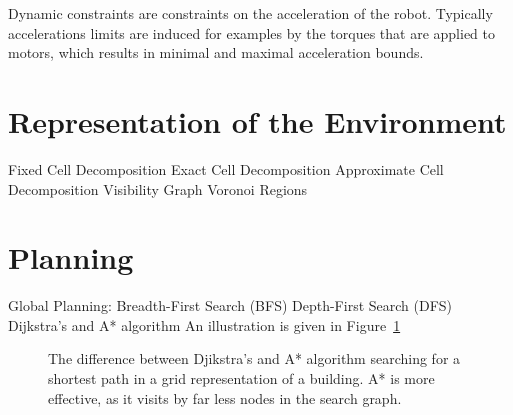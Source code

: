 Dynamic constraints are constraints on the acceleration of the robot.  Typically accelerations limits are induced for examples by the torques that are applied to motors, which results in minimal and maximal acceleration bounds.


\section{Representation of the Environment}\label{sec:representation}
Fixed Cell Decomposition
Exact Cell Decomposition
Approximate Cell Decomposition
Visibility Graph
Voronoi Regions

\section{Planning}\label{sec:global}
Global Planning:
Breadth-First Search (BFS)
Depth-First Search (DFS)
Dijkstra's and A* algorithm
An illustration is given in Figure~\ref{fig:fig_overview}
\begin{figure}[thpb]
	  \myfloatalign
      \footnotesize
      \centering
    
   \caption[Djikstra's and A* algorithm.]{The difference between Djikstra's and A* algorithm searching for a shortest path in a grid representation of a building. A* is more effective, as it visits by far less nodes in the search graph. }
\label{fig:fig_overview}
\end{figure}
